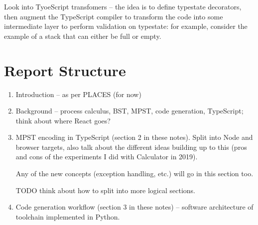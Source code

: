 \documentclass{article}
\begin{document}
Look into TyoeScript transfomers -- the idea is
to define typestate decorators, then augment the
TypeScript compiler to transform the code into some
intermediate layer to perform validation on
typestate: for example, consider the example of a 
stack that can either be full or empty.

\section{Report Structure}

\begin{enumerate}
\item 
Introduction -- as per PLACES (for now)

\item
Background -- process calculus, BST, MPST, code 
generation, TypeScript; think about where React goes?

\item
MPST encoding in TypeScript (section 2 in these notes).
Split into Node and browser targets, also talk about
the different ideas building up to this (pros and
cons of the experiments I did with Calculator in
2019).

Any of the new concepts (exception handling, etc.) will 
go in this section too.

TODO think about how to split into 
more logical sections.

\item
Code generation workflow (section 3 in these notes)
-- software architecture of
toolchain implemented in Python.

\end{enumerate}

\nocite{*}


\end{document}
